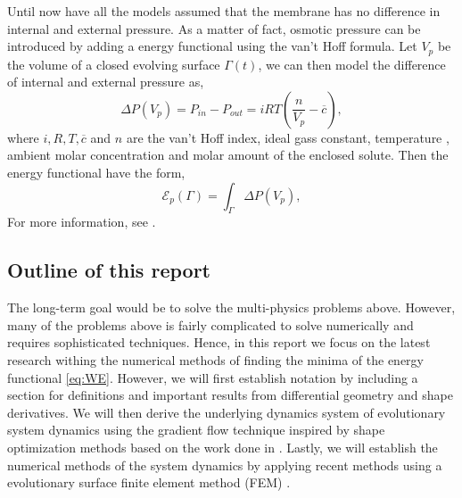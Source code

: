 Until now have all the models assumed that the membrane has no difference in internal and external pressure. As a matter of fact, osmotic pressure can be introduced by adding a energy functional using the van't Hoff formula. Let $V_{p}$ be the volume
of a closed evolving surface $\Gamma \left( t \right) $, we can then model the difference of internal and external pressure as,
\[
\Delta P \left( V_{p} \right) = P_{in} - P_{out} = iRT\left( \frac{n}{V_{p}} - \overline{c}  \right),
\]
where $i, R, T, \overline{c} $ and $n$ are the van't Hoff index, ideal gass constant, temperature , ambient molar concentration and molar amount of the enclosed solute. Then the energy
functional have the form,
\[
\mathcal{E} _{p}\left( \Gamma    \right)  = \int_{\Gamma   }^{   } \Delta P\left( V_{p} \right) ,
\]
For more information, see \cite{zhu2022mem3dg}.


\subsection{Outline of this report}%
\label{sub:outline_of_this_report}

The long-term goal would be to solve the multi-physics problems above. However, many of the problems above is fairly complicated to solve numerically and requires sophisticated techniques. Hence, in this report we focus on the latest research withing
the numerical methods of finding the minima of the energy functional \eqref{eq:WE}. However, we will first establish notation by including a section for definitions and important results from differential geometry and shape derivatives. We will then derive the
underlying dynamics system of evolutionary system dynamics using the gradient flow technique inspired by shape optimization methods based on the work done in \cite{ dougan2012first}. Lastly, we will establish the numerical methods of the system
dynamics by applying recent methods using a evolutionary surface finite element method (FEM) \cite{kovacs2021convergent, hu2022evolving}.


